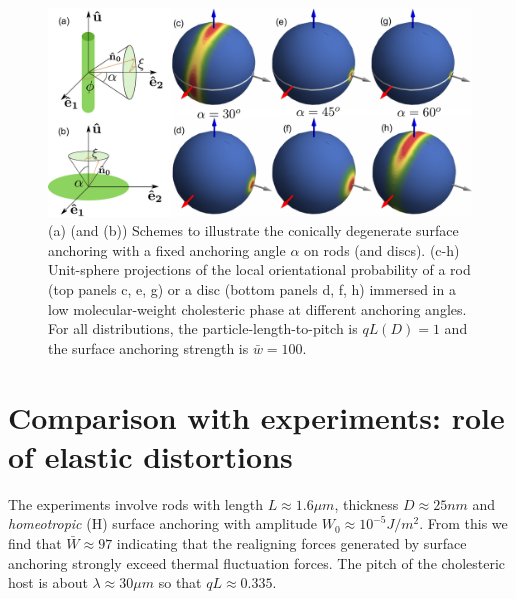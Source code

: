 \begin{figure}
	\includegraphics[width = \columnwidth]{figures/chapter-4/heliconical}
	\caption{ (a) (and (b)) Schemes to illustrate the conically degenerate surface anchoring with a fixed anchoring angle $\alpha$ on rods (and discs). (c-h) Unit-sphere projections of the local orientational probability of a rod (top panels c, e, g) or a disc (bottom panels d, f, h) immersed in a low molecular-weight cholesteric phase at different anchoring angles. For all distributions, the particle-length-to-pitch is $qL(D)=1$ and the surface anchoring strength is $\bar w = 100$. }
	\label{heliconical}
\end{figure}

\section[Role of elastic distortions]{Comparison with experiments: role of elastic distortions}

The experiments involve rods with length $L\approx 1.6 \mu m$, thickness $D \approx 25 nm$ and {\em homeotropic} (H) surface anchoring with amplitude $W_{0} \approx 10^{-5} J/m^{2}$. From this we find that $\bar{W} \approx 97$ indicating that the realigning forces generated by surface anchoring strongly exceed thermal fluctuation forces. The pitch of the cholesteric host is about $\lambda \approx 30 \mu m $ so that $qL  \approx 0.335 $.


